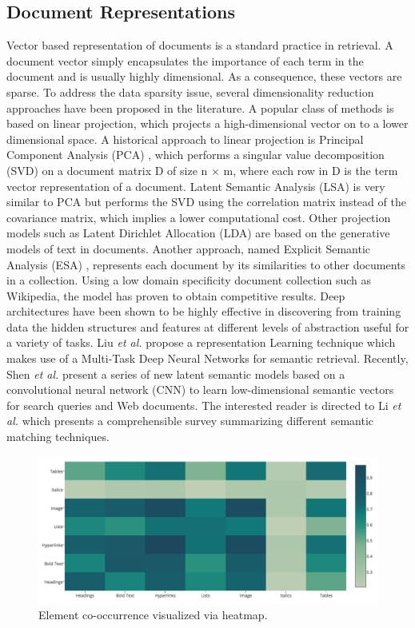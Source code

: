 \documentclass[runningheads,a4paper]{llncs}
\begin{document}
\subsection{Document Representations}
Vector based representation of documents is a standard practice in retrieval. 
A document vector simply encapsulates the importance of each 
term in the document and is usually highly dimensional. As a consequence, 
these vectors are sparse. To address the data
sparsity issue, several dimensionality reduction approaches have been proposed 
in the literature. A popular class of
methods is based on linear projection, which projects a high-dimensional vector on to a lower dimensional space. 
A historical approach to linear projection is Principal Component Analysis (PCA) 
\cite{jolliffe1986principal}, which performs a singular value decomposition 
(SVD) on a document matrix D of size n $\times$ m, where each row in D is the 
term vector representation of a document. Latent Semantic Analysis (LSA) 
\cite{deerwester1990indexing} is very similar to PCA but performs the SVD using 
the correlation matrix instead of the covariance matrix, which implies a lower 
computational cost. Other projection models such as Latent Dirichlet Allocation 
(LDA) \cite{blei2003latent} are based on the generative models of text in documents. 
Another approach, named Explicit Semantic Analysis (ESA) 
\cite{gabrilovich2007computing}, represents each document by its similarities to other documents in a collection. 
Using a low domain specificity document collection such 
as Wikipedia, the model has proven to obtain competitive results. Deep 
architectures have been shown to be highly effective in discovering from 
training data the hidden structures and features at different levels of 
abstraction useful for a variety of tasks. Liu \textit{et al.} 
\cite{liu2015representation} propose a representation Learning technique which 
makes use of a Multi-Task Deep Neural Networks for semantic retrieval. Recently, 
Shen \textit{et al.} \cite{shen2014learning} present a series of new latent 
semantic models based on a convolutional neural network (CNN) to learn 
low-dimensional semantic vectors for search queries and Web documents. The 
interested reader is directed to Li \textit{et al.} \cite{li2014semantic} which 
presents a comprehensible survey summarizing different semantic matching 
techniques.
\begin{figure}[t]
        \centering
        \includegraphics[width=0.8\linewidth]{heatmap.png}
        \caption{Element co-occurrence visualized via heatmap.}
        \label{fig:heatmap}
\end{figure}
\end{document}
